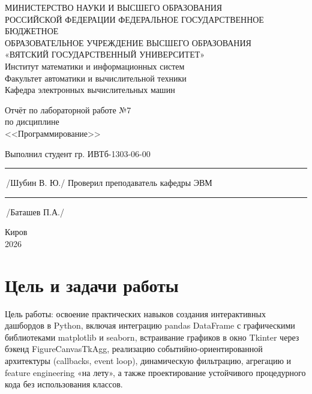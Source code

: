 \documentclass[oneside,a4paper,14pt]{extarticle}
\begin{document}
\newpage
\thispagestyle{empty}
\begin{center}
	МИНИСТЕРСТВО НАУКИ И ВЫСШЕГО ОБРАЗОВАНИЯ\\
	РОССИЙСКОЙ ФЕДЕРАЦИИ
	ФЕДЕРАЛЬНОЕ ГОСУДАРСТВЕННОЕ БЮДЖЕТНОЕ\\
	ОБРАЗОВАТЕЛЬНОЕ
	УЧРЕЖДЕНИЕ ВЫСШЕГО ОБРАЗОВАНИЯ\\
	«ВЯТСКИЙ ГОСУДАРСТВЕННЫЙ УНИВЕРСИТЕТ»\\
	Институт математики и информационных систем\\
	Факультет автоматики и вычислительной техники\\
	Кафедра электронных вычислительных машин
\end{center}

\vspace{20mm}

\begin{center}
	Отчёт по лабораторной работе №7\\
	по дисциплине\\
	<<Программирование>>
\end{center}

\vspace{48mm}

\noindent
Выполнил студент гр. ИВТб-1303-06-00 \hfill \rule[-0,5mm]{30mm}{0.15mm}\,/Шубин В. Ю./
\newline
Проверил преподаватель кафедры ЭВМ \hfill \rule[-0,5mm]{30mm}{0.15mm}\,/Баташев П.А./

\vfill

\begin{center}
	Киров\\
	2026
\end{center}

\newpage
\thispagestyle{empty}

\section{Цель и задачи работы}

Цель работы: освоение практических навыков создания интерактивных дашбордов в Python, включая интеграцию pandas DataFrame с графическими библиотеками matplotlib и seaborn, встраивание графиков в окно Tkinter через бэкенд FigureCanvasTkAgg, реализацию событийно-ориентированной архитектуры (callbacks, event loop), динамическую фильтрацию, агрегацию и feature engineering «на лету», а также проектирование устойчивого процедурного кода без использования классов.
\end{document}
